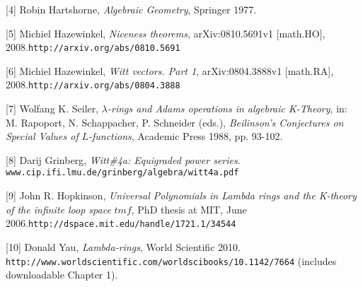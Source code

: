 \documentclass[numbers=enddot,12pt,final,onecolumn,notitlepage]{scrartcl}%
\begin{document}
[4] Robin Hartshorne, \textit{Algebraic Geometry}, Springer 1977.

[5] Michiel Hazewinkel, \textit{Niceness theorems}, arXiv:0810.5691v1
[math.HO], 2008.\newline\texttt{http://arxiv.org/abs/0810.5691}

[6] Michiel Hazewinkel, \textit{Witt vectors. Part 1}, arXiv:0804.3888v1
[math.RA], 2008.\newline\texttt{http://arxiv.org/abs/0804.3888}

[7] Wolfang K. Seiler, $\lambda$\textit{-rings and Adams operations in
algebraic K-Theory}, in: M. Rapoport, N. Schappacher, P. Schneider (eds.),
\textit{Beilinson's Conjectures on Special Values of }$L$\textit{-functions},
Academic Press 1988, pp. 93-102.

[8] Darij Grinberg, \textit{Witt\#4a: Equigraded power series}.\newline%
\texttt{www.cip.ifi.lmu.de/grinberg/algebra/witt4a.pdf}

[9] John R. Hopkinson, \textit{Universal Polynomials in Lambda rings and the
K-theory of the infinite loop space }$tmf$, PhD thesis at MIT, June
2006.\newline\texttt{http://dspace.mit.edu/handle/1721.1/34544}

[10] Donald Yau, \textit{Lambda-rings}, World Scientific 2010.\newline%
\texttt{http://www.worldscientific.com/worldscibooks/10.1142/7664}%
\newline(includes downloadable Chapter 1).
\end{document}
